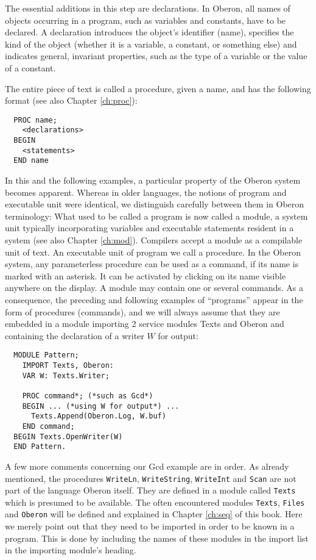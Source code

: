 The essential additions in this step are declarations. In Oberon, all names of objects
occurring in a program, such as variables and constants, have to be declared. A declaration
introduces the object's identifier (name), specifies the kind of the object (whether it
is a variable, a constant, or something else) and indicates general, invariant properties,
such as the type of a variable or the value of a constant.

The entire piece of text is called a procedure, given a name, and has the following format
(see also Chapter \ref{ch:proc}):
\begin{verbatim}
  PROC name;
    <declarations>
  BEGIN
    <statements>
  END name
\end{verbatim}

In this and the following examples, a particular property of the Oberon system becomes
apparent.  Whereas in older languages, the notions of program and executable unit were
identical, we distinguish carefully between them in Oberon terminology: What used to be
called a program is now called a module, a system unit typically incorporating variables
and executable statements resident in a system (see also Chapter \ref{ch:mod}). Compilers
accept a module as a compilable unit of text.  An executable unit of program we call a
procedure. In the Oberon system, any parameterless procedure can be used as a command, if
its name is marked with an asterisk. It can be activated by clicking on its name visible
anywhere on the display. A module may contain one or several commands. As a consequence,
the preceding and following examples of “programs” appear in the form of procedures
(commands), and we will always assume that they are embedded in a module importing 2
service modules Texts and Oberon and containing the declaration of a writer $W$ for output:
\begin{verbatim}
  MODULE Pattern;
    IMPORT Texts, Oberon:
    VAR W: Texts.Writer;

    PROC command*; (*such as Gcd*)
    BEGIN ... (*using W for output*) ...
      Texts.Append(Oberon.Log, W.buf)
    END command;
  BEGIN Texts.OpenWriter(W)
  END Pattern.
\end{verbatim}

A few more comments concerning our Gcd example are in order. As already mentioned, the procedures
\verb|WriteLn|, \verb|WriteString|, \verb|WriteInt| and \verb|Scan| are not part of the language
Oberon itself.  They are defined in a module called \verb|Texts| which is presumed to be available.
The often encountered modules \verb|Texts|, \verb|Files| and \verb|Oberon| will be defined and
explained in Chapter \ref{ch:seq} of this book.  Here we merely point out that they need to be
imported in order to be known in a program. This is done by including the names of these modules
in the import list in the importing module’s heading.

